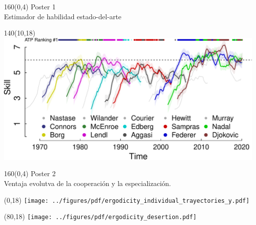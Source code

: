 \documentclass[aspectratio=169,10pt,xcolor=svgnames,compress]{beamer}
\begin{document}
\begin{frame}[plain]
\begin{textblock}{160}(0,4)
\centering \Large Poster 1 \\  
\large 
Estimador de habilidad estado-del-arte
\end{textblock}

\begin{textblock}{140}(10,18) \centering
\includegraphics[width=\linewidth]{../static/atp.pdf}
\end{textblock}

\end{frame}


\begin{frame}[plain]
\begin{textblock}{160}(0,4)
\centering \Large Poster 2 \\  
\large 
Ventaja evolutva de la cooperación y la especialización.
\end{textblock}


\begin{textblock}{80}(0,18) \centering
\texttt{[image: ../figures/pdf/ergodicity\_individual\_trayectories\_y.pdf]}
\end{textblock}

\begin{textblock}{80}(80,18) \centering
\texttt{[image: ../figures/pdf/ergodicity\_desertion.pdf]}
\end{textblock}

\end{frame}
\end{document}

